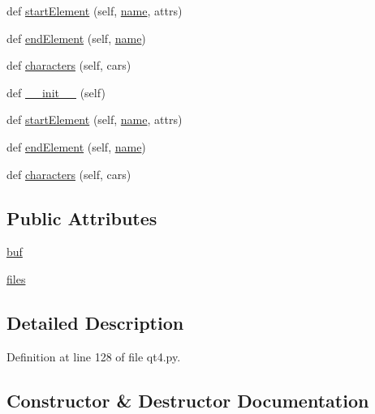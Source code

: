 \begin{DoxyCompactItemize}
\item 
def \hyperlink{classwaflib_1_1_tools_1_1qt4_1_1_x_m_l_handler_a4900b3c2d71e27909fd142618371e0dd}{start\+Element} (self, \hyperlink{lib_2expat_8h_a1b49b495b59f9e73205b69ad1a2965b0}{name}, attrs)
\item 
def \hyperlink{classwaflib_1_1_tools_1_1qt4_1_1_x_m_l_handler_a3ca61314858104050be53bd23a672e74}{end\+Element} (self, \hyperlink{lib_2expat_8h_a1b49b495b59f9e73205b69ad1a2965b0}{name})
\item 
def \hyperlink{classwaflib_1_1_tools_1_1qt4_1_1_x_m_l_handler_acdb9a245e889b637bb45442c4be487d1}{characters} (self, cars)
\item 
def \hyperlink{classwaflib_1_1_tools_1_1qt4_1_1_x_m_l_handler_a5090e66a9c76416e54d5865ed285df61}{\+\_\+\+\_\+init\+\_\+\+\_\+} (self)
\item 
def \hyperlink{classwaflib_1_1_tools_1_1qt4_1_1_x_m_l_handler_a4900b3c2d71e27909fd142618371e0dd}{start\+Element} (self, \hyperlink{lib_2expat_8h_a1b49b495b59f9e73205b69ad1a2965b0}{name}, attrs)
\item 
def \hyperlink{classwaflib_1_1_tools_1_1qt4_1_1_x_m_l_handler_a3ca61314858104050be53bd23a672e74}{end\+Element} (self, \hyperlink{lib_2expat_8h_a1b49b495b59f9e73205b69ad1a2965b0}{name})
\item 
def \hyperlink{classwaflib_1_1_tools_1_1qt4_1_1_x_m_l_handler_acdb9a245e889b637bb45442c4be487d1}{characters} (self, cars)
\end{DoxyCompactItemize}
\subsection*{Public Attributes}
\begin{DoxyCompactItemize}
\item 
\hyperlink{classwaflib_1_1_tools_1_1qt4_1_1_x_m_l_handler_abd305305f5abf7e30f8bd4bea925204c}{buf}
\item 
\hyperlink{classwaflib_1_1_tools_1_1qt4_1_1_x_m_l_handler_a1f0071e960728156e3c13be1e82c48f8}{files}
\end{DoxyCompactItemize}


\subsection{Detailed Description}


Definition at line 128 of file qt4.\+py.



\subsection{Constructor \& Destructor Documentation}
